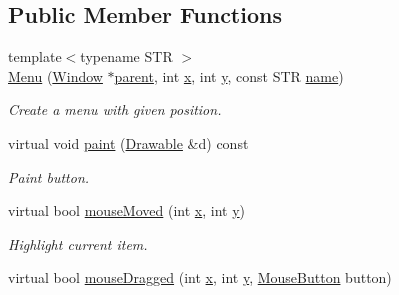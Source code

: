 \subsection*{Public Member Functions}
\begin{DoxyCompactItemize}
\item 
{\footnotesize template$<$typename S\-T\-R $>$ }\\\hyperlink{classGUI_1_1Menu_a3ad4f5a1fbc5aaf57a269a464a42c885}{Menu} (\hyperlink{classGUI_1_1Window}{Window} $\ast$\hyperlink{classGUI_1_1Window_a2e593ff65e7702178d82fe9010a0b539}{parent}, int \hyperlink{classGUI_1_1Window_a6ca6a80ca00c9e1d8ceea8d3d99a657d}{x}, int \hyperlink{classGUI_1_1Window_a0ee8e923aff2c3661fc2e17656d37adf}{y}, const S\-T\-R \hyperlink{classGUI_1_1ActionEventSource_ab494e66ccff6518e1cabe747df2173f8}{name})
\begin{DoxyCompactList}\small\item\em Create a menu with given position. \end{DoxyCompactList}\item 
\hypertarget{classGUI_1_1Menu_a731ee3b42950cc9210c4c017823c8b0c}{virtual void \hyperlink{classGUI_1_1Menu_a731ee3b42950cc9210c4c017823c8b0c}{paint} (\hyperlink{classGUI_1_1Drawable}{Drawable} \&d) const }\label{classGUI_1_1Menu_a731ee3b42950cc9210c4c017823c8b0c}

\begin{DoxyCompactList}\small\item\em Paint button. \end{DoxyCompactList}\item 
\hypertarget{classGUI_1_1Menu_a8c82c2e98eeaf6a9c232551504908ee8}{virtual bool \hyperlink{classGUI_1_1Menu_a8c82c2e98eeaf6a9c232551504908ee8}{mouse\-Moved} (int \hyperlink{classGUI_1_1Window_a6ca6a80ca00c9e1d8ceea8d3d99a657d}{x}, int \hyperlink{classGUI_1_1Window_a0ee8e923aff2c3661fc2e17656d37adf}{y})}\label{classGUI_1_1Menu_a8c82c2e98eeaf6a9c232551504908ee8}

\begin{DoxyCompactList}\small\item\em Highlight current item. \end{DoxyCompactList}\item 
\hypertarget{classGUI_1_1Menu_ac625425b56b527467ddbbaa107fa12cb}{virtual bool \hyperlink{classGUI_1_1Menu_ac625425b56b527467ddbbaa107fa12cb}{mouse\-Dragged} (int \hyperlink{classGUI_1_1Window_a6ca6a80ca00c9e1d8ceea8d3d99a657d}{x}, int \hyperlink{classGUI_1_1Window_a0ee8e923aff2c3661fc2e17656d37adf}{y}, \hyperlink{namespaceGUI_ad06082a7b02aa73697f39eb8e0856de9}{Mouse\-Button} button)}\label{classGUI_1_1Menu_ac625425b56b527467ddbbaa107fa12cb}


\end{DoxyCompactItemize}

